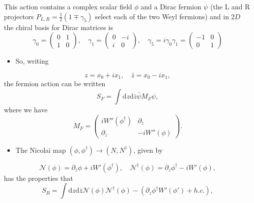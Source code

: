 This action contains a complex scalar field $\phi$ and a Dirac fermion $\psi$ (the L and R projectors $P_{L,R} = \frac{1}{2}(1 \mp \gamma_5)$ select each of the two Weyl fermions) and in $2D$ the chiral basis for Dirac matrices is
\begin{equation}
    \gamma_0 = \begin{pmatrix}
        0 & 1 \\
        1 & 0
    \end{pmatrix}, \quad \gamma_1 = \begin{pmatrix}
        0 & -i \\
        i & 0
    \end{pmatrix}, \quad \gamma_{5} =i \gamma_0 \gamma_1 =  \begin{pmatrix}
        -1 & 0 \\
        0 & 1
    \end{pmatrix}
\end{equation}
\begin{itemize}
    \item So, writing
\end{itemize}
\begin{equation}
    z = x_0 + i x_1, \quad \bar{z} = x_0 - i x_1,
\end{equation}
the fermion action can be written
\begin{equation}
    S_F = \int \text{d}z \text{d}\bar{z} \bar{\psi} M_F \psi,
\end{equation}
where we have
\begin{equation}
    M_F = \begin{pmatrix}
        i W''(\phi^\dagger) & \partial_{\bar{z}} \\
        \partial_z & -i W''(\phi)
    \end{pmatrix}.
\end{equation}
\begin{itemize}
    \item The Nicolai map $(\phi,\phi^\dagger)\to(N,N^\dagger)$, given by
\end{itemize}
\begin{equation}
    \mathcal{N}(\phi) = \partial_{\bar{z}}\phi + i W'(\phi^\dagger), \quad \mathcal{N}^\dagger(\phi) = \partial_z \phi^\dagger - i W'(\phi),
\end{equation}
has the properties that
\begin{equation}
    S_B = \int \text{d}z \text{d}\bar{z} \mathcal{N}(\phi)\mathcal{N}^\dagger(\phi) - (\partial_z \phi^\dagger W'(\phi') + h.c.),
\end{equation}

